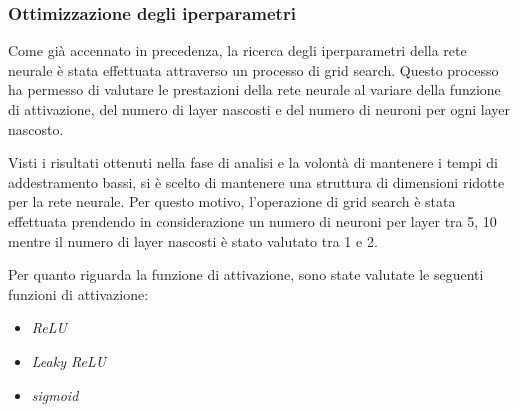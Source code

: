 \subsubsection{Ottimizzazione degli iperparametri}
Come già accennato in precedenza, la ricerca degli iperparametri della rete neurale
è stata effettuata attraverso un processo di grid search. Questo processo ha
permesso di valutare le prestazioni della rete neurale al variare della funzione
di attivazione, del numero di layer nascosti e del numero di neuroni per ogni
layer nascosto.

Visti i risultati ottenuti nella fase di analisi e la volontà di mantenere i
tempi di addestramento bassi, si è scelto di mantenere una struttura di dimensioni
ridotte per la rete neurale. Per questo motivo, l'operazione di grid search è
stata effettuata prendendo in considerazione un numero di neuroni per layer
tra 5, 10 mentre il numero di layer nascosti è stato valutato tra 1 e 2.

Per quanto riguarda la funzione di attivazione, sono state valutate le seguenti
funzioni di attivazione:
\begin{itemize}
    \item \textit{ReLU}
    \item \textit{Leaky ReLU}
    \item \textit{sigmoid}
\end{itemize}


